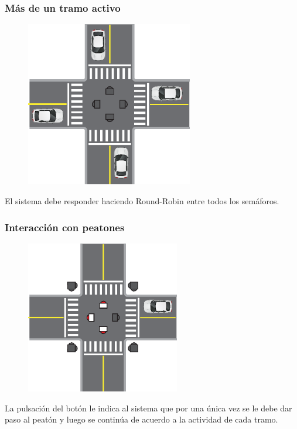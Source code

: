 \begin{frame}
\frametitle{Más de un tramo activo}
\begin{figure}[htbp]
	\centering
	\includegraphics[width=0.65\textwidth]{diagramas/todos-activos.eps}
\end{figure}
El sistema debe responder haciendo Round-Robin entre todos los semáforos.
\end{frame}

\begin{frame}
\frametitle{Interacción con peatones}
\begin{figure}[htbp]
	\centering
	\includegraphics[width=0.60\textwidth]{diagramas/peaton-auto.eps}
\end{figure}
La pulsación del botón le indica al sistema que por una única vez se le debe dar paso al peatón y luego se continúa de acuerdo a la actividad de cada tramo.
\end{frame}

